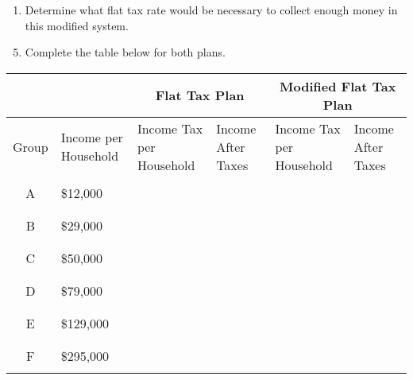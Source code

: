 \begin{exercises}
{\begin{enumerate}[1)]
\item Determine what flat tax rate would be necessary to collect enough money in this modified system.
\end{enumerate}
}
\vfill
\pagebreak

\begin{minipage}[t]{\textwidth}
\begin{enumerate}[1)]
\setcounter{enumi}{4}
\item Complete the table below for both plans.
\end{enumerate}

\begin{center}
\begin{tabular}{|c | p{0.75in} | p{1.1in} | p{0.85in} | p{1.1in} | p{0.85in} |}
\hline
\multicolumn{2}{|c|}{} & \multicolumn{2}{c|}{Flat Tax Plan} & \multicolumn{2}{c|}{Modified Flat Tax Plan}\\
\hline
Group & Income per Household & Income Tax per Household & Income After Taxes & Income Tax per Household & Income After Taxes\\
\hline
& & & & & \\
A & \$12,000 & & & & \\
& & & & & \\
\hline
& & & & & \\
B & \$29,000 & & & & \\
& & & & & \\
\hline
& & & & & \\
C & \$50,000 & & & & \\
& & & & & \\
\hline
& & & & & \\
D & \$79,000 & & & & \\
& & & & & \\
\hline
& & & & & \\
E & \$129,000 & & & & \\
& & & & & \\
\hline
& & & & & \\
F & \$295,000 & & & & \\
& & & & & \\
\hline
\end{tabular}
\end{center}


\end{minipage}
\end{exercises}
